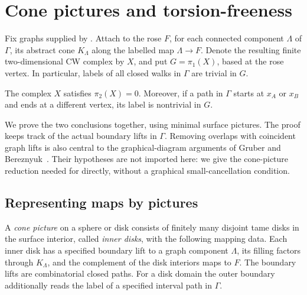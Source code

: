 \section{Cone pictures and torsion-freeness}\label{sec:topology}

Fix graphs supplied by . Attach to the rose \(F\), for each connected component \(\Lambda\) of \(\Gamma\), its abstract cone \(K_\Lambda\) along the labelled map \(\Lambda\to F\). Denote the resulting finite two-dimensional CW complex by \(X\), and put \(G=\pi_1(X)\), based at the rose vertex. In particular, labels of all closed walks in \(\Gamma\) are trivial in \(G\).

\begin{proposition}\label{prop:topology}
The complex \(X\) satisfies \(\pi_2(X)=0\). Moreover, if a path in \(\Gamma\) starts at \(x_A\) or \(x_B\) and ends at a different vertex, its label is nontrivial in \(G\).
\end{proposition}

We prove the two conclusions together, using minimal surface pictures. The proof keeps track of the actual boundary lifts in \(\Gamma\). Removing overlaps with coincident graph lifts is also central to the graphical-diagram arguments of Gruber and Bereznyuk~\cite{Gruber2015,Bereznyuk2019}. Their hypotheses are not imported here: we give the cone-picture reduction needed for  directly, without a graphical small-cancellation condition.

\subsection{Representing maps by pictures}

A \emph{cone picture} on a sphere or disk consists of finitely many disjoint tame disks in the surface interior, called \emph{inner disks}, with the following mapping data. Each inner disk has a specified boundary lift to a graph component \(\Lambda\), its filling factors through \(K_\Lambda\), and the complement of the disk interiors maps to \(F\). The boundary lifts are combinatorial closed paths. For a disk domain the outer boundary additionally reads the label of a specified interval path in \(\Gamma\).

